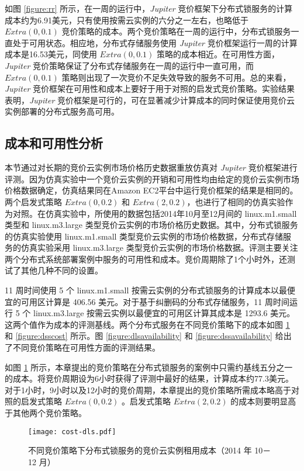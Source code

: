 如图 \ref{figure:rr} 所示，在一周的运行中，\emph{Jupiter} 竞价框架下分布式锁服务的计算成本约为6.91美元，只有使用按需云实例的六分之一左右，也略低于 $Extra(0, 0.1)$ 竞价策略的成本。两个竞价策略在一周的运行中，分布式锁服务一直处于可用状态。相应地，分布式存储服务使用 \emph{Jupiter} 竞价框架运行一周的计算成本是16.53美元，同使用 $Extra(0, 0.1)$ 策略的成本相近。在可用性方面，\emph{Jupiter} 竞价策略保证了分布式存储服务在一周的运行中一直可用，而 $Extra(0, 0.1)$ 策略则出现了一次竞价不足失效导致的服务不可用。总的来看，\emph{Jupiter} 竞价框架在可用性和成本上要好于用于对照的启发式竞价策略。实验结果表明，\emph{Jupiter} 竞价框架是可行的，可在显著减少计算成本的同时保证使用竞价云实例部署的分布式服务高可用。

\subsection{成本和可用性分析}
\label{subsec:ca}
本节通过对长期的竞价云实例市场价格历史数据重放仿真对 \emph{Jupiter} 竞价框架进行评测。因为仿真实验中一个竞价云实例的开销和可用性均由给定的竞价云实例市场价格数据确定，仿真结果同在Amazon EC2平台中运行竞价框架的结果是相同的。两个启发式策略 $Extra(0, 0.2)$ 和 $Extra(2, 0.2)$，也进行了相同的仿真实验作为对照。在仿真实验中，所使用的数据包括2014年10月至12月间的 linux.m1.small 类型和 linux.m3.large 类型竞价云实例的市场价格历史数据。其中，分布式锁服务的仿真实验使用 linux.m1.small 类型竞价云实例的市场价格数据，分布式存储服务的仿真实验采用 linux.m3.large 类型竞价云实例的市场价格数据。评测主要关注两个分布式系统部署案例中服务的可用性和成本。竞价周期除了1个小时外，还测试了其他几种不同的设置。

11 周时间使用 5 个 linux.m1.small 按需云实例的分布式锁服务的计算成本以最便宜的可用区计算是 406.56 美元。对于基于纠删码的分布式存储服务，11 周时间运行 5 个 linux.m3.large 按需云实例以最便宜的可用区计算其成本是 1293.6 美元。这两个值作为成本的评测基线。两个分布式服务在不同竞价策略下的成本如图 \ref{figure:dlscost} 和 \ref{figure:dsscost} 所示。图 \ref{figure:dlsavailability} 和 \ref{figure:dssavailability} 给出了不同竞价策略在可用性方面的评测结果。

如图 \ref{figure:dlscost} 所示，本章提出的竞价策略在分布式锁服务的案例中只需约基线五分之一的成本。将竞价周期设为6小时获得了评测中最好的结果，计算成本约77.3美元。对于1小时，9小时以及12小时的竞价周期，本章提出的竞价策略所需成本略高于对照的启发式策略 $Extra(0, 0.2)$ 。启发式策略 $Extra(2, 0.2)$ 的成本则要明显高于其他两个竞价策略。
\begin{figure}
  \centering
  \texttt{[image: cost-dls.pdf]}
  \caption{不同竞价策略下分布式锁服务的竞价云实例租用成本（2014 年 10－12 月）}
  \label{figure:dlscost}
\end{figure}

